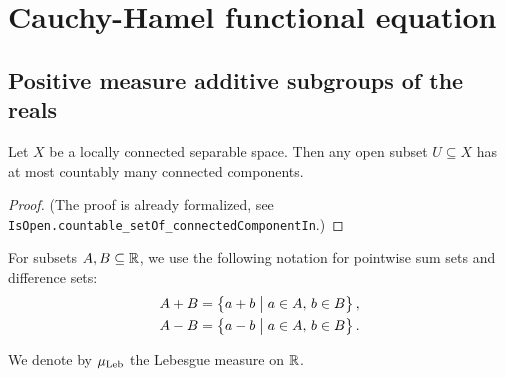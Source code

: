 \chapter{Cauchy-Hamel functional equation}

\section{Positive measure additive subgroups of the reals}

\begin{lemma}
  \label{lem:countably-many-connected-components-of-open}
  \leanok
  Let $X$ be a locally connected separable space. Then any open subset $U \subseteq X$ has at
  most countably many connected components.
\end{lemma}
\begin{proof}
  \leanok
  (The proof is already formalized, see
  \texttt{IsOpen.countable_setOf_connectedComponentIn}.)
\end{proof}

For subsets $A, B \subseteq \mathbb{R}$, we use the following notation for pointwise
sum sets and difference sets:
\begin{align*}
  A + B & = \left\{  a + b \; \big| \; a \in A, \, b \in B  \right\} , \\
  A - B & = \left\{  a - b \; \big| \; a \in A, \, b \in B  \right\} .
\end{align*}

We denote by $\mu_{\mathrm{Leb}}$ the Lebesgue measure on $\mathbb{R}$.

